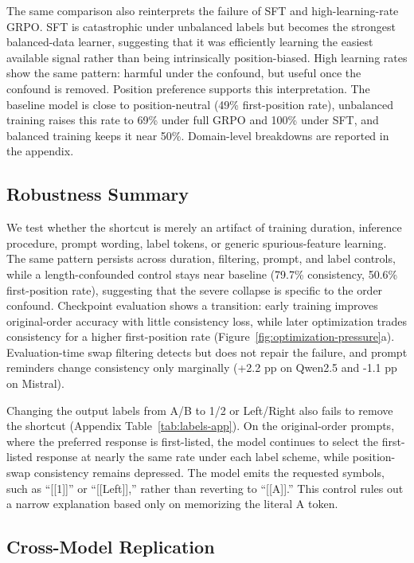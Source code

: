 \documentclass[11pt]{article}
\begin{document}
The same comparison also reinterprets the failure of SFT and high-learning-rate GRPO. SFT is catastrophic under unbalanced labels but becomes the strongest balanced-data learner, suggesting that it was efficiently learning the easiest available signal rather than being intrinsically position-biased. High learning rates show the same pattern: harmful under the confound, but useful once the confound is removed. Position preference supports this interpretation. The baseline model is close to position-neutral (49\% first-position rate), unbalanced training raises this rate to 69\% under full GRPO and 100\% under SFT, and balanced training keeps it near 50\%. Domain-level breakdowns are reported in the appendix.

\subsection{Robustness Summary}

We test whether the shortcut is merely an artifact of training duration, inference procedure, prompt wording, label tokens, or generic spurious-feature learning. The same pattern persists across duration, filtering, prompt, and label controls, while a length-confounded control stays near baseline (79.7\% consistency, 50.6\% first-position rate), suggesting that the severe collapse is specific to the order confound. Checkpoint evaluation shows a transition: early training improves original-order accuracy with little consistency loss, while later optimization trades consistency for a higher first-position rate (Figure~\ref{fig:optimization-pressure}a). Evaluation-time swap filtering detects but does not repair the failure, and prompt reminders change consistency only marginally (+2.2 pp on Qwen2.5 and -1.1 pp on Mistral).

Changing the output labels from A/B to 1/2 or Left/Right also fails to remove the shortcut (Appendix Table~\ref{tab:labels-app}). On the original-order prompts, where the preferred response is first-listed, the model continues to select the first-listed response at nearly the same rate under each label scheme, while position-swap consistency remains depressed. The model emits the requested symbols, such as ``[[1]]'' or ``[[Left]],'' rather than reverting to ``[[A]].'' This control rules out a narrow explanation based only on memorizing the literal A token.

\subsection{Cross-Model Replication}
\end{document}
